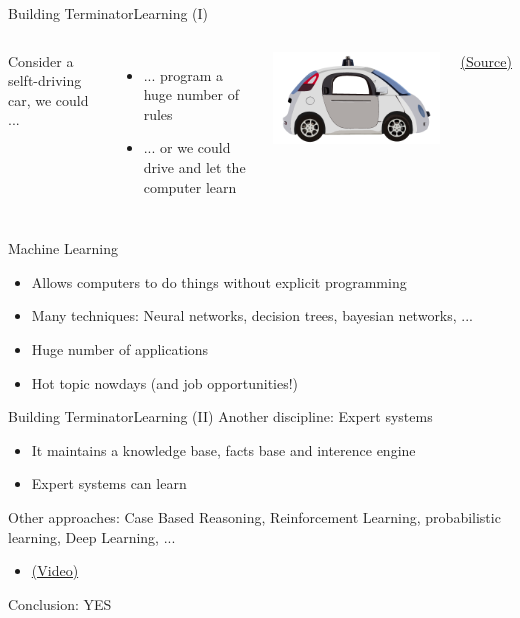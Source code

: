 \documentclass[10pt,compress]{beamer} %
\begin{document}
\begin{frame}{Building Terminator}{Learning (I)}
	\begin{columns}
			Consider a selft-driving car, we could ...
			\begin{itemize}
				\item ... program a huge number of rules
				\item ... or we could drive and let the computer learn
			\end{itemize}
			\includegraphics[width=\linewidth]{figs/car.png}\\
			\vspace{-0.2cm}
			\begin{center}
			\tiny{\href{http://www.national.co.uk/tech-powers-google-car/}{(Source)}}
			\end{center}
	\end{columns}

	Machine Learning
	\begin{itemize}
		\item Allows computers to do things without explicit programming
		\item Many techniques: Neural networks, decision trees, bayesian networks, ...
		\item Huge number of applications
		\item Hot topic nowdays (and job opportunities!)
	\end{itemize}
	
\end{frame}

\begin{frame}{Building Terminator}{Learning (II)}
	Another discipline: Expert systems
	\begin{itemize}
		\item It maintains a knowledge base, facts base and interence engine
		\item Expert systems can learn
	\end{itemize}
	Other approaches: Case Based Reasoning, Reinforcement Learning, probabilistic learning, Deep Learning, ...
	\begin{itemize}
		\item \href{https://www.youtube.com/watch?v=W_gxLKSsSIE}{(Video)}
	\end{itemize}
	Conclusion: YES
\end{frame}
\end{document}
